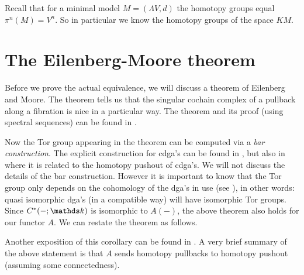 Recall that for a minimal model $M = (\Lambda V, d)$ the homotopy groups equal $\pi^n(M) = V^n$. So in particular we know the homotopy groups of the space $KM$.



\section{The Eilenberg-Moore theorem}
Before we prove the actual equivalence, we will discuss a theorem of Eilenberg and Moore. The theorem tells us that the singular cochain complex of a pullback along a fibration is nice in a particular way. The theorem and its proof (using spectral sequences) can be found in \cite[Theorem 7.14]{mccleary}.


Now the Tor group appearing in the theorem can be computed via a \emph{bar construction}. The explicit construction for cdga's can be found in \cite{bousfield}, but also in \cite{olsson} where it is related to the homotopy pushout of cdga's. We will not discuss the details of the bar construction. However it is important to know that the Tor group only depends on the cohomology of the dga's in use (see \cite[Corollary 7.7]{mccleary}), in other words: quasi isomorphic dga's (in a compatible way) will have isomorphic Tor groups. Since $C^\ast(-;\k)$ is isomorphic to $A(-)$, the above theorem also holds for our functor $A$. We can restate the theorem as follows.

Another exposition of this corollary can be found in \cite[Section 8.4]{berglund}. A very brief summary of the above statement is that $A$ sends homotopy pullbacks to homotopy pushout (assuming some connectedness).

